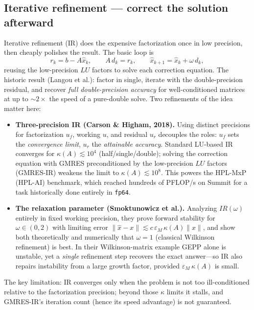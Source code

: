 \documentclass[11pt]{article}
\begin{document}
\subsection{Iterative refinement --- correct the solution afterward}

Iterative refinement (IR) does the expensive factorization once in low precision, then
cheaply polishes the result. The basic loop is
\[
r_k = b - A\hat{x}_k,\qquad A\,d_k = r_k,\qquad \hat{x}_{k+1}=\hat{x}_k+\omega\, d_k,
\]
reusing the low-precision $LU$ factors to solve each correction equation. The historic
result (Langou et al.): factor in single, iterate with the double-precision residual, and
recover \emph{full double-precision accuracy} for well-conditioned matrices at up to
$\sim2\times$ the speed of a pure-double solve. Two refinements of the idea matter here:

\begin{itemize}\itemsep2pt
  \item \textbf{Three-precision IR (Carson \& Higham, 2018).} Using distinct precisions
  for factorization $u_f$, working $u$, and residual $u_r$ decouples the roles: $u_f$ sets
  the \emph{convergence limit}, $u_r$ the \emph{attainable accuracy}. Standard LU-based IR
  converges for $\kappa(A)\lesssim10^{4}$ (half/single/double); solving the correction
  equation with GMRES preconditioned by the low-precision $LU$ factors (GMRES-IR) weakens
  the limit to $\kappa(A)\lesssim10^{8}$. This powers the HPL-MxP (HPL-AI) benchmark, which
  reached hundreds of PFLOP/s on Summit for a task historically done entirely in \texttt{fp64}.
  \item \textbf{The relaxation parameter (Smoktunowicz et al.).} Analyzing $IR(\omega)$
  entirely in fixed working precision, they prove forward stability for $\omega\in(0,2)$
  with limiting error $\|\hat{x}-x\|\lesssim c\,\varepsilon_M\,\kappa(A)\|x\|$, and show
  both theoretically and numerically that $\omega=1$ (classical Wilkinson refinement) is
  best. In their Wilkinson-matrix example GEPP alone is unstable, yet a \emph{single}
  refinement step recovers the exact answer---so IR also repairs instability from a large
  growth factor, provided $\varepsilon_M\,\kappa(A)$ is small.
\end{itemize}
The key limitation: IR converges only when the problem is not too ill-conditioned relative
to the factorization precision; beyond those $\kappa$ limits it stalls, and GMRES-IR's
iteration count (hence its speed advantage) is not guaranteed.
\end{document}
